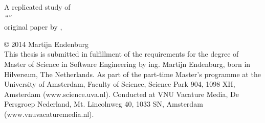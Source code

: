 \null
\vspace{10em}

\begin{center}
	A replicated study of\\[1em]
	\textit{``\repltitle''}\\[1em]
	\footnotesize{original paper by \replauthor{}, \citeyear{karus2013}}\rm
\end{center}

\vfill

\noindent\copyright{ 2014} Martijn Endenburg\\[0.3cm]
This thesis is submitted in fulfillment of the requirements for the degree of
Master of Science in Software Engineering by ing. Martijn Endenburg, born in
Hilversum, The Netherlands. As part of the part-time Master's programme at the
University of Amsterdam, Faculty of Science, Science Park 904, 1098 XH,
Amsterdam (www.science.uva.nl). Conducted at VNU Vacature Media, De
Persgroep Nederland, Mt. Lincolnweg 40, 1033 SN, Amsterdam
(www.vnuvacaturemedia.nl).
